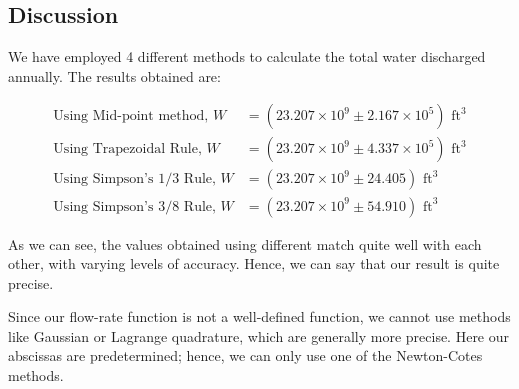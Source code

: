 \subsection{Discussion}
We have employed 4 different methods to calculate the total water discharged annually. The results obtained are:

\begin{align*}
    \text{Using Mid-point method,  } W &= (23.207 \times 10^{9} \pm 2.167 \times 10^5) \text{ ft}^3\\
    \text{Using Trapezoidal Rule,  } W &= (23.207 \times 10^{9} \pm 4.337 \times 10^5) \text{ ft}^3\\
    \text{Using Simpson's 1/3 Rule,  } W &= (23.207 \times 10^{9} \pm 24.405) \text{ ft}^3\\
    \text{Using Simpson's 3/8 Rule,  } W &= (23.207 \times 10^{9} \pm 54.910) \text{ ft}^3
\end{align*}

\noindent As we can see, the values obtained using different match quite well with each other, with varying levels of accuracy.
Hence, we can say that our result is quite precise.

Since our flow-rate function is not a well-defined function, we cannot use methods like Gaussian or Lagrange quadrature, which are generally more precise. Here our abscissas are predetermined; hence, we can only use one of the Newton-Cotes methods.